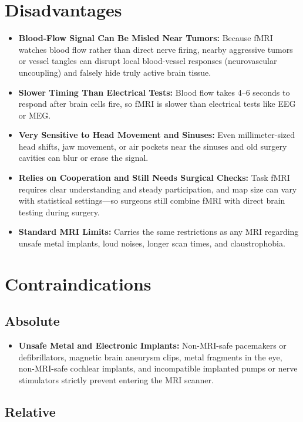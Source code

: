 \section{Disadvantages}

\begin{itemize}
    \item \textbf{Blood-Flow Signal Can Be Misled Near Tumors:} Because fMRI watches blood flow rather than direct nerve firing, nearby aggressive tumors or vessel tangles can disrupt local blood-vessel responses (neurovascular uncoupling) and falsely hide truly active brain tissue.
    \item \textbf{Slower Timing Than Electrical Tests:} Blood flow takes 4--6 seconds to respond after brain cells fire, so fMRI is slower than electrical tests like EEG or MEG.
    \item \textbf{Very Sensitive to Head Movement and Sinuses:} Even millimeter-sized head shifts, jaw movement, or air pockets near the sinuses and old surgery cavities can blur or erase the signal.
    \item \textbf{Relies on Cooperation and Still Needs Surgical Checks:} Task fMRI requires clear understanding and steady participation, and map size can vary with statistical settings---so surgeons still combine fMRI with direct brain testing during surgery.
    \item \textbf{Standard MRI Limits:} Carries the same restrictions as any MRI regarding unsafe metal implants, loud noises, longer scan times, and claustrophobia.
\end{itemize}

\section{Contraindications}

\subsection{Absolute}

\begin{itemize}
    \item \textbf{Unsafe Metal and Electronic Implants:} Non-MRI-safe pacemakers or defibrillators, magnetic brain aneurysm clips, metal fragments in the eye, non-MRI-safe cochlear implants, and incompatible implanted pumps or nerve stimulators strictly prevent entering the MRI scanner.
\end{itemize}

\subsection{Relative}

